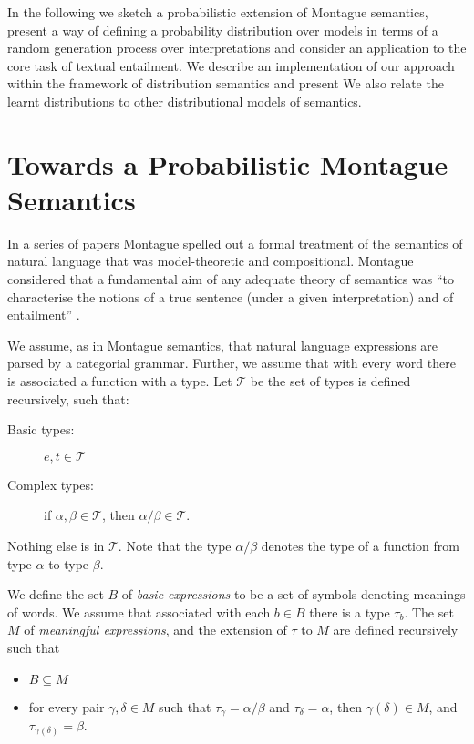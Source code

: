 \documentclass[letterpaper]{article}
\begin{document}
In the following we sketch a probabilistic extension of Montague semantics, present a way of defining a probability distribution over models in terms of a random generation process over interpretations and consider an application to the core task of textual entailment.  We describe an implementation of our approach within the framework of distribution semantics \cite{ref} and present  We also  relate the learnt
distributions to other distributional models of semantics.

\section{Towards a Probabilistic Montague Semantics}

In a series of papers \cite{ug,elf,ptq} Montague spelled out a formal treatment of the semantics of natural language that was model-theoretic and compositional. 
Montague considered that a fundamental aim of any adequate theory of semantics was ``to characterise the notions of a true sentence (under a given interpretation) and of entailment'' \cite{ug}. 

We assume, as in Montague semantics, that natural language expressions
are parsed by a categorial grammar. Further, we assume that with every word there is
associated a function with a type. Let $\mathcal{T}$ be the set of types is defined
recursively, such that:
\begin{description}
\item [Basic types:] $e,t\in \mathcal{T}$
\item[Complex types:]  if $\alpha, \beta\in \mathcal{T}$, then $\alpha/\beta\in \mathcal{T}$.
\end{description}
Nothing else is in $\mathcal{T}$. Note that the type $\alpha/\beta$ denotes the type of a function from type
$\alpha$ to type $\beta$.

We define the set $B$ of \emph{basic expressions} to be a set of
symbols denoting meanings of words. We assume that associated with
each $b\in B$ there is a type $\tau_b$. The set $M$ of
\emph{meaningful expressions}, and the extension of $\tau$ to $M$ are
defined recursively such that
\begin{itemize}
\item $B\subseteq M$
\item for every pair $\gamma,\delta\in M$ such that $\tau_\gamma =
  \alpha/\beta$ and $\tau_\delta = \alpha$, then $\gamma(\delta)\in
  M$, and $\tau_{\gamma(\delta)} = \beta$.
\end{itemize}
\end{document}
